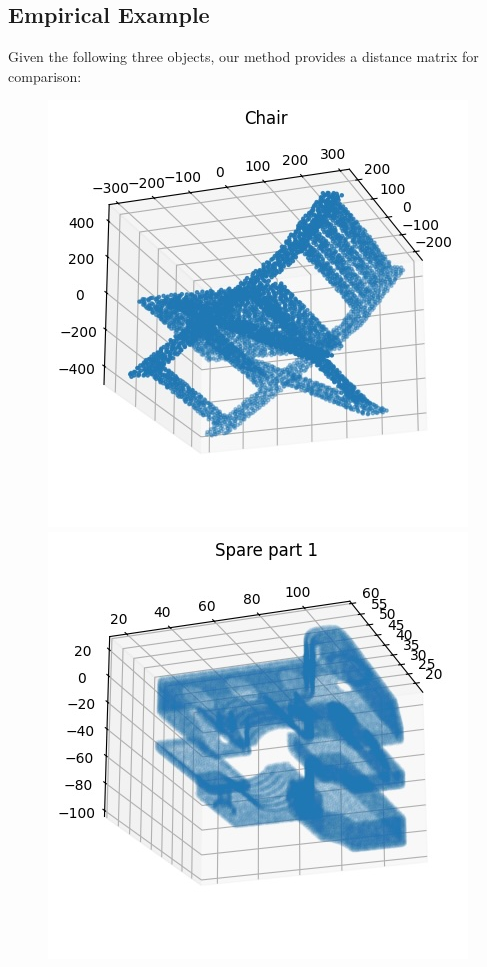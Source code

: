 \documentclass{article}
\begin{document}
\subsection{Empirical Example}
Given the following three objects, our method provides a distance matrix for comparison:
\begin{figure}[!htb]
  \includegraphics[width=\linewidth]{pics/chair_cp.jpg}
\endminipage\hfill
{}
  \includegraphics[width=\linewidth]{pics/spare_part_1_cp.jpg}

\end{figure}
\end{document}
